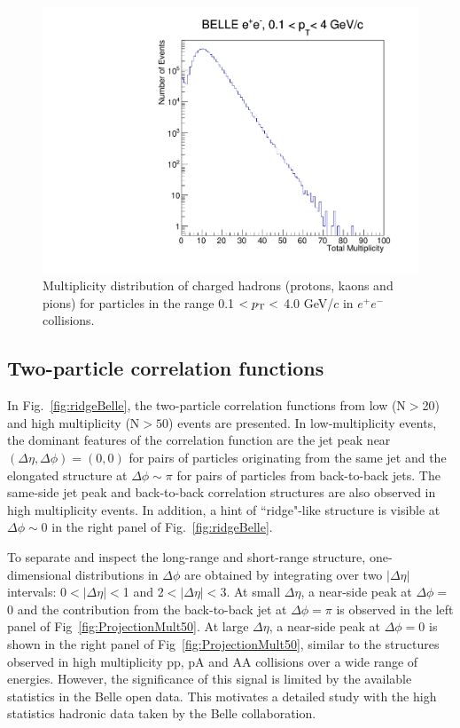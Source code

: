 \begin{figure}[!htb]
\begin{center}
\includegraphics[width=.45\textwidth]{figures/total_mult.pdf}
\caption{Multiplicity distribution of charged hadrons (protons, kaons and pions) for  particles in the range  0.1 $<p_{\rm T}<$ 4.0 GeV/$c$ in $e^{+}e^{-}$ collisions. }
\label{fig:multHadron} 
\end{center}
\end{figure}

\subsection{Two-particle correlation functions}

In Fig.~\ref{fig:ridgeBelle}, the two-particle correlation functions from low (N$>$20) and high multiplicity (N$>50$) events are presented. In low-multiplicity events, the dominant features of the correlation function are the jet peak near $(\Delta\eta,\Delta\phi)=(0,0)$ for pairs of particles originating from the same jet and the elongated structure at $\Delta\phi\sim\pi$ for pairs of particles from back-to-back jets. %
The same-side jet peak and back-to-back correlation structures are also observed in high multiplicity events. 
In addition, a hint of ``ridge"-like structure is visible at $\Delta\phi \sim$0 in the right panel of Fig.~\ref{fig:ridgeBelle}. 

To separate and inspect the long-range and short-range structure, one-dimensional distributions in $\Delta\phi$ are obtained by integrating over two $|\Delta\eta|$ intervals: 0$<|\Delta \eta|<$1 and 
2$<|\Delta \eta|<$3.  At small $\Delta\eta$, a near-side peak at $\Delta\phi=$0 and the contribution from the back-to-back jet at $\Delta\phi=\pi$ is observed in the left panel of Fig~\ref{fig:ProjectionMult50}. At large $\Delta\eta$, a near-side peak at $\Delta\phi=0$ is shown in the right panel of Fig~\ref{fig:ProjectionMult50}, similar to the structures observed in high multiplicity pp, pA and AA collisions over a wide range of energies. However, the significance of this signal is limited by the available statistics in the Belle open data. This motivates a detailed study with the high statistics hadronic data taken by the Belle collaboration. 

